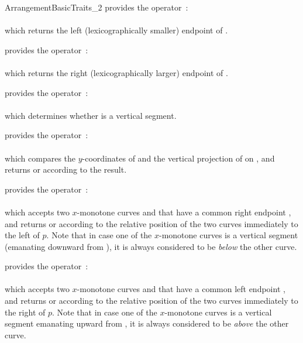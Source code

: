 \begin{ccRefConcept}{ArrangementBasicTraits_2}
{provides the operator~: \\
  \\
 which returns the left (lexicographically smaller) endpoint of .}

{provides the operator~: \\
  \\
 which returns the right (lexicographically larger) endpoint of .}

{provides the operator~: \\
  \\
 which determines whether  is a vertical segment.}

{provides the operator~: \\
  \\
 which compares the $y$-coordinates of  and the vertical projection
 of  on , and returns  or 
 according to the result.}

{provides the operator~: \\
  \\
 which accepts two $x$-monotone curves  and  that have
 a common right endpoint , and returns  or
  according to the relative position of the two curves
 immediately to the left of $p$. Note that in case one of the $x$-monotone
 curves is a vertical segment (emanating downward from ), it is always
 considered to be {\sl below} the other curve.}

{provides the operator~: \\
  \\
 which accepts two $x$-monotone curves  and  that have
 a common left endpoint , and returns  or
  according to the relative position of the two curves
 immediately to the right of $p$. Note that in case one of the $x$-monotone
 curves is a vertical segment emanating upward from , it is always
 considered to be {\sl above} the other curve.}


\end{ccRefConcept}
